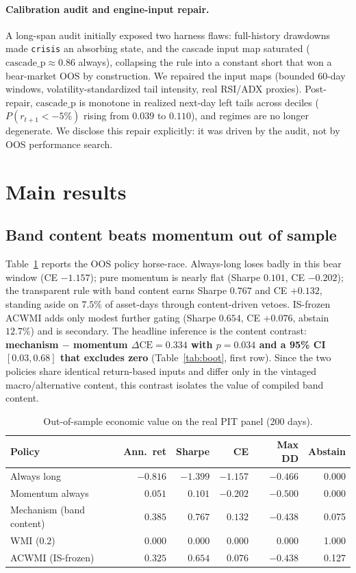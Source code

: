 \documentclass[12pt]{article}
\begin{document}
\paragraph{Calibration audit and engine-input repair.}
A long-span audit initially exposed two harness flaws: full-history drawdowns made \texttt{crisis} an absorbing state, and the cascade input map saturated ($\mathrm{cascade\_p}\approx0.86$ always), collapsing the rule into a constant short that won a bear-market OOS by construction. We repaired the input maps (bounded 60-day windows, volatility-standardized tail intensity, real RSI/ADX proxies). Post-repair, $\mathrm{cascade\_p}$ is monotone in realized next-day left tails across deciles ($P(r_{t+1}<-5\%)$ rising from $0.039$ to $0.110$), and regimes are no longer degenerate. We disclose this repair explicitly: it was driven by the audit, not by OOS performance search.

\section{Main results}
\label{sec:results}

\subsection{Band content beats momentum out of sample}
Table~\ref{tab:econ} reports the OOS policy horse-race. Always-long loses badly in this bear window (CE $-1.157$); pure momentum is nearly flat (Sharpe $0.101$, CE $-0.202$); the transparent rule with band content earns Sharpe $0.767$ and CE $+0.132$, standing aside on $7.5\%$ of asset-days through content-driven vetoes. IS-frozen ACWMI adds only modest further gating (Sharpe $0.654$, CE $+0.076$, abstain $12.7\%$) and is secondary. The headline inference is the content contrast: \textbf{mechanism $-$ momentum $\Delta\mathrm{CE}=0.334$ with $p=0.034$ and a 95\% CI $[0.03,0.68]$ that excludes zero} (Table~\ref{tab:boot}, first row). Since the two policies share identical return-based inputs and differ only in the vintaged macro/alternative content, this contrast isolates the value of compiled band content.

\begin{table}[t]
\centering
\caption{Out-of-sample economic value on the real PIT panel (200 days).}
\label{tab:econ}
\begin{tabular}{lrrrrr}
\toprule
Policy & Ann.\ ret & Sharpe & CE & Max DD & Abstain \\
\midrule
Always long & $-0.816$ & $-1.399$ & $-1.157$ & $-0.466$ & 0.000 \\
Momentum always & $0.051$ & $0.101$ & $-0.202$ & $-0.500$ & 0.000 \\
Mechanism (band content) & $0.385$ & $0.767$ & $0.132$ & $-0.438$ & 0.075 \\
WMI ($0.2$) & $0.000$ & $0.000$ & $0.000$ & $0.000$ & 1.000 \\
ACWMI (IS-frozen) & $0.325$ & $0.654$ & $0.076$ & $-0.438$ & 0.127 \\
\bottomrule
\end{tabular}
\end{table}
\end{document}
